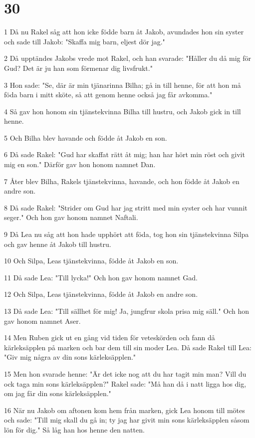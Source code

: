 \chapter{30}

\par 1 Då nu Rakel såg att hon icke födde barn åt Jakob, avundades hon sin syster och sade till Jakob: "Skaffa mig barn, eljest dör jag."
\par 2 Då upptändes Jakobs vrede mot Rakel, och han svarade: "Håller du då mig för Gud? Det är ju han som förmenar dig livsfrukt."
\par 3 Hon sade: "Se, där är min tjänarinna Bilha; gå in till henne, för att hon må föda barn i mitt sköte, så att genom henne också jag får avkomma."
\par 4 Så gav hon honom sin tjänstekvinna Bilha till hustru, och Jakob gick in till henne.
\par 5 Och Bilha blev havande och födde åt Jakob en son.
\par 6 Då sade Rakel: "Gud har skaffat rätt åt mig; han har hört min röst och givit mig en son." Därför gav hon honom namnet Dan.
\par 7 Åter blev Bilha, Rakels tjänstekvinna, havande, och hon födde åt Jakob en andre son.
\par 8 Då sade Rakel: "Strider om Gud har jag stritt med min syster och har vunnit seger." Och hon gav honom namnet Naftali.
\par 9 Då Lea nu såg att hon hade upphört att föda, tog hon sin tjänstekvinna Silpa och gav henne åt Jakob till hustru.
\par 10 Och Silpa, Leas tjänstekvinna, födde åt Jakob en son.
\par 11 Då sade Lea: "Till lycka!" Och hon gav honom namnet Gad.
\par 12 Och Silpa, Leas tjänstekvinna, födde åt Jakob en andre son.
\par 13 Då sade Lea: "Till sällhet för mig! Ja, jungfrur skola prisa mig säll." Och hon gav honom namnet Aser.
\par 14 Men Ruben gick ut en gång vid tiden för veteskörden och fann då kärleksäpplen på marken och bar dem till sin moder Lea. Då sade Rakel till Lea: "Giv mig några av din sons kärleksäpplen."
\par 15 Men hon svarade henne: "Är det icke nog att du har tagit min man? Vill du ock taga min sons kärleksäpplen?" Rakel sade: "Må han då i natt ligga hos dig, om jag får din sons kärleksäpplen."
\par 16 När nu Jakob om aftonen kom hem från marken, gick Lea honom till mötes och sade: "Till mig skall du gå in; ty jag har givit min sons kärleksäpplen såsom lön för dig." Så låg han hos henne den natten.
